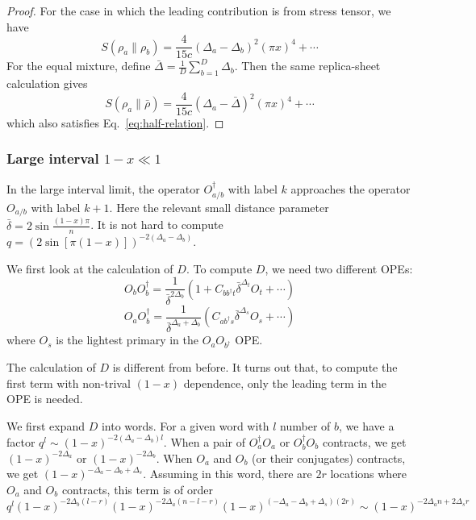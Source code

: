 \documentclass{article}
\theoremstyle{plain}
\theoremstyle{definition}
\theoremstyle{plain}
\begin{document}
\begin{proof}
For the case in which the leading contribution is from stress tensor, we have
\begin{equation}
    S\left(\rho_a \| \rho_b\right)=\frac{4}{15 c}\left(\Delta_a-\Delta_b\right)^2(\pi x)^4+\cdots
\end{equation}
For the equal mixture, define $
\bar{\Delta}=\frac{1}{D} \sum_{b=1}^D \Delta_b .$ Then the same replica-sheet calculation gives
\begin{equation}
  S\left(\rho_a \| \bar{\rho}\right)=\frac{4}{15 c}\left(\Delta_a-\bar{\Delta}\right)^2(\pi x)^4+\cdots  
\end{equation}
which also satisfies Eq.~\eqref{eq:half-relation}.





    
\end{proof}


\subsubsection{Large interval $1-x\ll 1$}

In the large interval limit, the operator $O_{a/b}^\dagger$ with label $k$ approaches the operator $O_{a/b}$ with label $k+1$. Here the relevant small distance parameter $\bar \delta = 2\sin \frac{(1-x)\pi}{n}$. It is not hard to compute $q=(2\sin [\pi(1-x)])^{-2(\Delta_a-\Delta_b)} $.

We first look at the calculation of $D$. 
To compute $D$, we need two different OPEs:
\begin{equation}
    O_b O_b^\dagger = \frac{1}{\bar\delta^{2\Delta_b}} \left(1+C_{bb^\dagger t} \bar\delta^{\Delta_t} O_t +\cdots \right)
\end{equation}
\begin{equation}
    O_a O_b^\dagger = \frac{1}{\bar\delta^{\Delta_a+\Delta_b}} \left(C_{ab^\dagger s} \bar\delta^{\Delta_s} O_s +\cdots \right)
\end{equation}
where $O_s$ is the lightest primary in the $O_a O_{b^\dagger}$ OPE.

The calculation of $D$ is different from before. It turns out that, to compute the first term with non-trival $(1-x)$ dependence, only the leading term in the OPE is needed. 

We first expand $D$ into words. For a given word with $l$ number of $b$, we have a factor $q^l \sim (1-x)^{-2(\Delta_a-\Delta_b)l}$. When a pair of $O_a^\dagger O_a$ or $O_b^\dagger O_b$ contracts, we get $(1-x)^{-2\Delta_a}$ or $(1-x)^{-2\Delta_b}$. When $O_a$ and $O_b$ (or their conjugates) contracts, we get $(1-x)^{-\Delta_a-\Delta_b+\Delta_s}$. Assuming in this word, there are $2r$ locations where $O_a$ and $O_b$ contracts, this term is of order 
\begin{equation}
    q^l (1-x)^{-2\Delta_b(l-r)} (1-x)^{-2\Delta_a(n-l-r)} (1-x)^{(-\Delta_a-\Delta_b+\Delta_s)(2r)} \sim (1-x)^{-2\Delta_a n +2\Delta_s r}
\end{equation}
\end{document}
